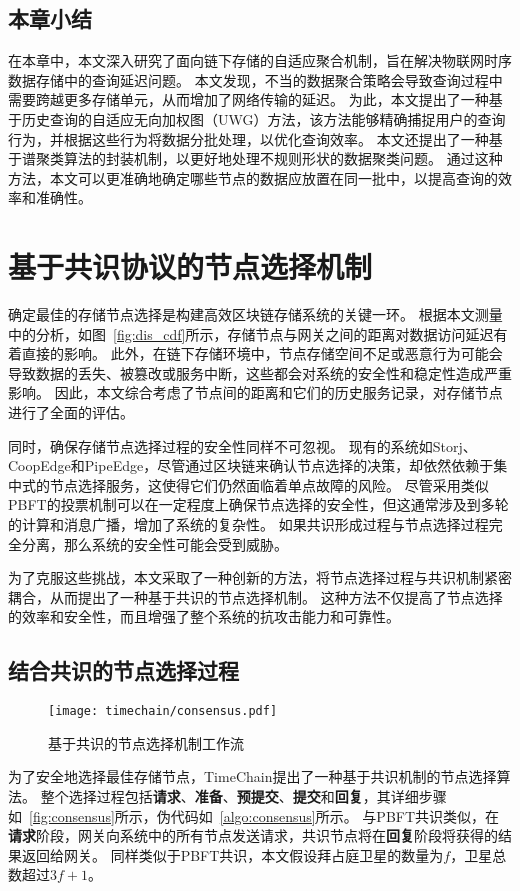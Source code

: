 \section{本章小结}
在本章中，本文深入研究了面向链下存储的自适应聚合机制，旨在解决物联网时序数据存储中的查询延迟问题。
本文发现，不当的数据聚合策略会导致查询过程中需要跨越更多存储单元，从而增加了网络传输的延迟。
为此，本文提出了一种基于历史查询的自适应无向加权图（UWG）方法，该方法能够精确捕捉用户的查询行为，并根据这些行为将数据分批处理，以优化查询效率。
本文还提出了一种基于谱聚类算法的封装机制，以更好地处理不规则形状的数据聚类问题。
通过这种方法，本文可以更准确地确定哪些节点的数据应放置在同一批中，以提高查询的效率和准确性。

\chapter{基于共识协议的节点选择机制}
\label{sec:consensus}
确定最佳的存储节点选择是构建高效区块链存储系统的关键一环。
根据本文测量中的分析，如图~\autoref{fig:dis_cdf}所示，存储节点与网关之间的距离对数据访问延迟有着直接的影响。
此外，在链下存储环境中，节点存储空间不足或恶意行为可能会导致数据的丢失、被篡改或服务中断，这些都会对系统的安全性和稳定性造成严重影响。
因此，本文综合考虑了节点间的距离和它们的历史服务记录，对存储节点进行了全面的评估。

同时，确保存储节点选择过程的安全性同样不可忽视。
现有的系统如Storj、CoopEdge和PipeEdge，尽管通过区块链来确认节点选择的决策，却依然依赖于集中式的节点选择服务，这使得它们仍然面临着单点故障的风险。
尽管采用类似PBFT的投票机制可以在一定程度上确保节点选择的安全性，但这通常涉及到多轮的计算和消息广播，增加了系统的复杂性。
如果共识形成过程与节点选择过程完全分离，那么系统的安全性可能会受到威胁。

为了克服这些挑战，本文采取了一种创新的方法，将节点选择过程与共识机制紧密耦合，从而提出了一种基于共识的节点选择机制。
这种方法不仅提高了节点选择的效率和安全性，而且增强了整个系统的抗攻击能力和可靠性。

\section{结合共识的节点选择过程}

\begin{figure}[t]
    \centering
    \texttt{[image: timechain/consensus.pdf]}
    \caption{基于共识的节点选择机制工作流}
    \label{fig:consensus}
\end{figure}

为了安全地选择最佳存储节点，TimeChain提出了一种基于共识机制的节点选择算法。
整个选择过程包括\textbf{请求}、\textbf{准备}、\textbf{预提交}、\textbf{提交}和\textbf{回复}，其详细步骤如~\autoref{fig:consensus}所示，伪代码如~\autoref{algo:consensus}所示。
与PBFT共识类似，在\textbf{请求}阶段，网关向系统中的所有节点发送请求，共识节点将在\textbf{回复}阶段将获得的结果返回给网关。
同样类似于PBFT共识，本文假设拜占庭卫星的数量为$f$，卫星总数超过$3f+1$。

